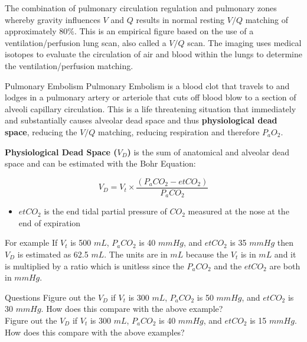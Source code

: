 The combination of pulmonary circulation regulation and pulmonary zones whereby gravity influences $V$ and $Q$ results in normal resting $V/Q$ matching of approximately 80\%. This is an empirical figure based on the use of a ventilation/perfusion lung scan, also called a $V/Q$ scan.  The imaging uses medical isotopes to evaluate the circulation of air and blood within the lungs to determine the ventilation/perfusion matching. 

\begin{warning}{Pulmonary Embolism}
    Pulmonary Embolism is a blood clot that travels to and lodges in a pulmonary artery or arteriole that cuts off blood blow to a section of alveoli capillary circulation. This is a life threatening situation that immediately and substantially causes alveolar dead space and thus \textbf{physiological dead space}, reducing the $V/Q$ matching, reducing respiration and therefore $P_aO_2$.
\end{warning}

\textbf{Physiological Dead Space ($V_D$)} is the sum of anatomical and alveolar dead space and can be estimated with the Bohr Equation:

\begin{equation}
    V_D = V_t \times \frac{(P_aCO_2 - etCO_2)}{P_aCO_2}
    \label{eq:bohr}
 \end{equation}

\begin{itemize}
    \item $etCO_2$ is the end tidal partial pressure of $CO_2$ measured at the nose at the end of expiration
\end{itemize}

\begin{important}{For example}
    If $V_t$ is 500 $mL$, $P_aCO_2$ is 40 $mmHg$, and $etCO_2$ is 35 $mmHg$ then $V_D$ is estimated as 62.5 $mL$. The units are in $mL$ because the $V_t$ is in $mL$ and it is multiplied by a ratio which is unitless since the $P_aCO_2$ and the $etCO_2$ are both in $mmHg$.
\end{important}

\begin{question}{Questions}
    Figure out the $V_D$ if $V_t$ is 300 $mL$, $P_aCO_2$ is 50 $mmHg$, and $etCO_2$ is 30 $mmHg$. How does this compare with the above example? \\
    Figure out the $V_D$ if $V_t$ is 300 $mL$, $P_aCO_2$ is 40 $mmHg$, and $etCO_2$ is 15 $mmHg$. How does this compare with the above examples?
\end{question}


